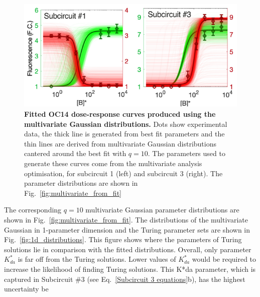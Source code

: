 \begin{figure}[H] %
    \centering
        \includegraphics[width=1\textwidth]{chapters/Chapter 2/dose_response_multivariate_gaussian} %
    \caption{\textbf{Fitted OC14 dose-response curves
    produced using the multivariate Gaussian distributions.}
    Dots show experimental data,
        the thick line is generated from best fit parameters and the thin lines are derived from multivariate Gaussian distributions cantered around the best fit with $q=10$.
        The parameters used to generate these curves come from the multivariate analysis optimisation, for subcircuit 1 (left) and subcircuit 3 (right). The parameter distributions are shown in Fig.~\ref{fig:multivariate_from_fit}}
    \label{fig:dose_response_multivariate_gaussian} %
\end{figure}
The corresponding $q=10$ multivariate Gaussian parameter distributions are shown in Fig.~\ref{fig:multivariate_from_fit}.
The distributions of the multivariate Gaussian in 1-parameter dimension and the Turing parameter sets are shown in Fig.~\ref{fig:1d_distributions}.
This figure shows where the parameters of Turing solutions lie in comparison with the fitted distributions.
Overall, only parameter $K^*_{da}$ is far off from the Turing solutions.
Lower values of $K^*_{da}$ would be required to increase the likelihood of finding Turing solutions.
This K*da parameter, which is captured in Subcircuit \#3 (see Eq.~\ref{Subcircuit 3 equations}b), has the highest uncertainty be

